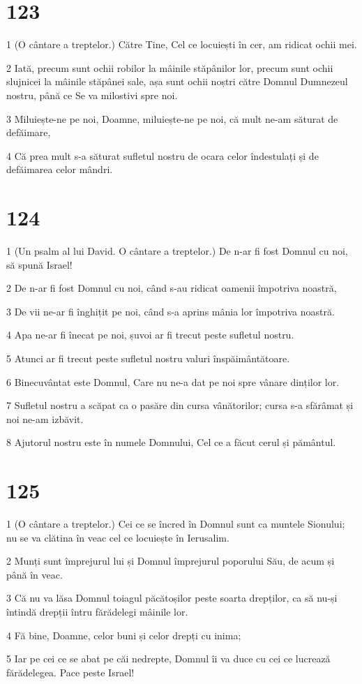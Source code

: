 \chapter{123}

\par 1 (O cântare a treptelor.) Către Tine, Cel ce locuiești în cer, am ridicat ochii mei.
\par 2 Iată, precum sunt ochii robilor la mâinile stăpânilor lor, precum sunt ochii slujnicei la mâinile stăpânei sale, așa sunt ochii noștri către Domnul Dumnezeul nostru, până ce Se va milostivi spre noi.
\par 3 Miluiește-ne pe noi, Doamne, miluiește-ne pe noi, că mult ne-am săturat de defăimare,
\par 4 Că prea mult s-a săturat sufletul nostru de ocara celor îndestulați și de defăimarea celor mândri.

\chapter{124}

\par 1 (Un psalm al lui David. O cântare a treptelor.) De n-ar fi fost Domnul cu noi, să spună Israel!
\par 2 De n-ar fi fost Domnul cu noi, când s-au ridicat oamenii împotriva noastră,
\par 3 De vii ne-ar fi înghițit pe noi, când s-a aprins mânia lor împotriva noastră.
\par 4 Apa ne-ar fi înecat pe noi, șuvoi ar fi trecut peste sufletul nostru.
\par 5 Atunci ar fi trecut peste sufletul nostru valuri înspăimântătoare.
\par 6 Binecuvântat este Domnul, Care nu ne-a dat pe noi spre vânare dinților lor.
\par 7 Sufletul nostru a scăpat ca o pasăre din cursa vânătorilor; cursa s-a sfărâmat și noi ne-am izbăvit.
\par 8 Ajutorul nostru este în numele Domnului, Cel ce a făcut cerul și pământul.

\chapter{125}

\par 1 (O cântare a treptelor.) Cei ce se încred în Domnul sunt ca muntele Sionului; nu se va clătina în veac cel ce locuiește în Ierusalim.
\par 2 Munți sunt împrejurul lui și Domnul împrejurul poporului Său, de acum și până în veac.
\par 3 Că nu va lăsa Domnul toiagul păcătoșilor peste soarta drepților, ca să nu-și întindă drepții întru fărădelegi mâinile lor.
\par 4 Fă bine, Doamne, celor buni și celor drepți cu inima;
\par 5 Iar pe cei ce se abat pe căi nedrepte, Domnul îi va duce cu cei ce lucrează fărădelegea. Pace peste Israel!


